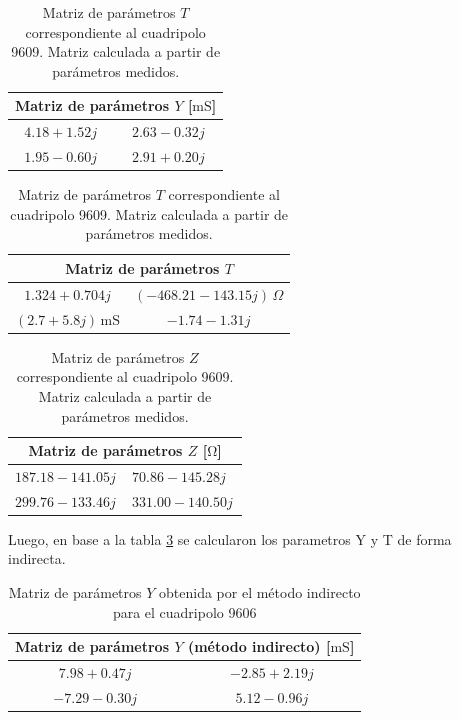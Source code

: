 \begin{table}[H]
\centering
\begin{minipage}{0.48\textwidth}
\centering
\begin{tabular}{|c|c|}
\hline
\multicolumn{2}{|c|}{\textbf{Matriz de parámetros $Y$ [$\mathrm{mS}$]}} \\ \hline
$4.18 + 1.52j\,$ & $2.63 - 0.32j\,$ \\ \hline
$1.95 - 0.60j\,$ & $2.91 + 0.20j\,$ \\ \hline
\end{tabular}
\caption{Matriz de parámetros $Y$ correspondiente al cuadripolo 9609. Matriz calculada a partir de parámetros medidos.}
\label{tab:matriz_Y_9609}
\end{minipage}
\hfill
\begin{minipage}{0.48\textwidth}
\centering
\begin{tabular}{|c|c|}
\hline
\multicolumn{2}{|c|}{\textbf{Matriz de parámetros $T$}} \\ \hline
$1.324 + 0.704j$ & $(-468.21 - 143.15j)\,\Omega$ \\ \hline
$(2.7 + 5.8j)\,\mathrm{mS}$ & $-1.74 - 1.31j$ \\ \hline
\end{tabular}
\caption{Matriz de parámetros $T$ correspondiente al cuadripolo 9609. Matriz calculada a partir de parámetros medidos.}
\label{tab:matriz_T_9609}
\end{minipage}
\end{table}

\begin{table}[H]
\centering
\begin{tabular}{|l|l|}
\hline
\multicolumn{2}{|c|}{\textbf{Matriz de parámetros $Z$ [$\mathrm{\Omega}$]}} \\ \hline
$187.18 - 141.05j\,$ & $70.86 - 145.28j\,$ \\ \hline
$299.76 - 133.46j\, $ & $331.00 - 140.50j\,$ \\ \hline
\end{tabular}
\caption{Matriz de parámetros $Z$ correspondiente al cuadripolo 9609. Matriz calculada a partir de parámetros medidos.}
\label{tab:matriz_Z9609}
\end{table}

Luego, en base a la tabla \ref{tab:matriz_Z9609} se calcularon los parametros Y y T de forma indirecta.
	
	\begin{table}[H]
\centering
\begin{tabular}{|c|c|}
\hline
\multicolumn{2}{|c|}{\textbf{Matriz de parámetros $Y$ (método indirecto) [$\mathrm{mS}$]}} \\ \hline
$7.98 + 0.47j\,$ & $-2.85 + 2.19j\,$ \\ \hline
$-7.29 - 0.30j\,$ & $5.12 - 0.96j\,$ \\ \hline
\end{tabular}
\caption{Matriz de parámetros $Y$ obtenida por el método indirecto para el cuadripolo 9606}
\label{tab:matriz_Y9606_indirecta}
\end{table}

